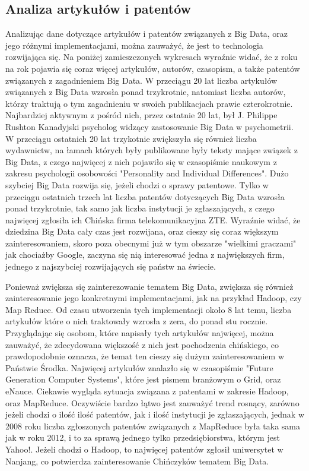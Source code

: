 \subsection{Analiza artykułów i patentów}
\label{sub:analiza_artykulow}
Analizując dane dotyczące artykułów i patentów związanych z Big Data, oraz jego różnymi implementacjami, można zauważyć, że jest to technologia rozwijająca się. Na poniżej zamieszczonych wykresach wyraźnie widać, że z roku na rok pojawia się coraz więcej artykułów, autorów, czasopism, a także patentów związanych z zagadnieniem Big Data. W przeciągu 20 lat liczba artykułów związanych z Big Data wzrosła ponad trzykrotnie, natomiast liczba autorów, którzy traktują o tym zagadnieniu w swoich publikacjach prawie czterokrotnie. Najbardziej aktywnym z pośród nich, przez ostatnie 20 lat, był J. Philippe Rushton Kanadyjski psycholog widzący zastosowanie Big Data w psychometrii. W przeciągu ostatnich 20 lat trzykotnie zwiększyła się również liczba wydawnictw, na łamach których były publikowane były teksty mające związek z Big Data, z czego najwięcej z nich pojawiło się w czasopiśmie naukowym z zakresu psychologii osobowości "Personality and Individual Differences". Dużo szybciej Big Data rozwija się, jeżeli chodzi o sprawy patentowe. Tylko w przeciągu ostatnich trzech lat liczba patentów dotyczących Big Data wzrosła ponad trzykrotnie, tak samo jak liczba instytucji je zgłaszających, z czego najwięcej zgłosiła ich Chińska firma telekomunikacyjna ZTE. Wyraźnie widać, że dziedzina Big Data cały czas jest rozwijana, oraz cieszy się coraz większym zainteresowaniem, skoro poza obecnymi już w tym obszarze "wielkimi graczami" jak chociażby Google, zaczyna się nią interesować jedna z największych firm, jednego z najszybciej rozwijających się państw na świecie.

Ponieważ zwiększa się zainterezowanie tematem Big Data, zwiększa się również zainteresowanie jego konkretnymi implementacjami, jak na przykład Hadoop, czy Map Reduce. Od czasu utworzenia tych implementacji około 8 lat temu, liczba artykułów które o nich traktowały wzrosła z zera, do ponad stu rocznie. Przyglądając się osobom, które napisały tych artykułów najwięcej, można zauważyć, że zdecydowana większość z nich jest pochodzenia chińskiego, co prawdopodobnie oznacza, że temat ten cieszy się dużym zainteresowaniem w Państwie Środka. Najwięcej artykułów znalazło się w czasopiśmie "Future Generation Computer Systems", które jest pismem branżowym o Grid, oraz eNauce. Ciekawie wygląda sytuacja związana z patentami w zakresie Hadoop, oraz MapReduce. Oczywiście bardzo łątwo jest zauważyć trend rosnący, zarówno jeżeli chodzi o ilość ilość patentów, jak i ilość instytucji je zgłaszających, jednak w 2008 roku liczba zgłoszonych patentów związanych z MapReduce była taka sama jak w roku 2012, i to za sprawą jednego tylko przedsiębiorstwa, którym jest Yahoo!. Jeżeli chodzi o Hadoop, to najwięcej patentów zgłosił uniwersytet w Nanjang, co potwierdza zainteresowanie Chińczyków tematem Big Data.


